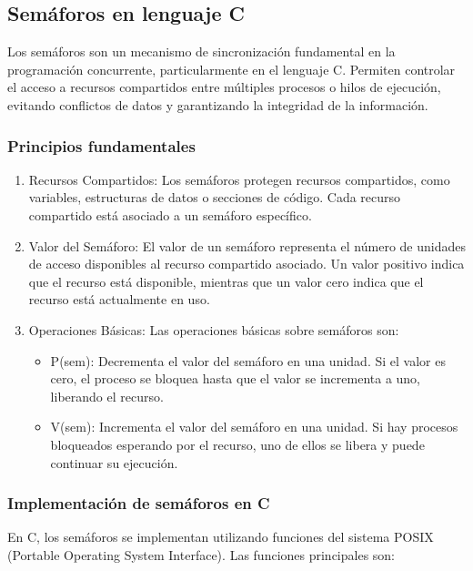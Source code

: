 \subsection{Semáforos en lenguaje C}

Los semáforos son un mecanismo de sincronización fundamental en la programación concurrente, particularmente en el lenguaje C. Permiten controlar el acceso a recursos compartidos entre múltiples procesos o hilos de ejecución, evitando conflictos de datos y garantizando la integridad de la información.

\subsubsection{Principios fundamentales}

\begin{enumerate}
	\def\labelenumi{\arabic{enumi}.}
	\item   Recursos Compartidos: Los semáforos protegen recursos compartidos,   como variables, estructuras de datos o secciones de código. Cada   recurso compartido está asociado a un semáforo específico.
	\item   Valor del Semáforo: El valor de un semáforo representa el número de   unidades de acceso disponibles al recurso compartido asociado. Un   valor positivo indica que el recurso está disponible, mientras que un   valor cero indica que el recurso está actualmente en uso.
	\item   Operaciones Básicas: Las operaciones básicas sobre semáforos son:
	\begin{itemize}
		\item P(sem): Decrementa el valor del semáforo en una unidad. Si el valor     es cero, el proceso se bloquea hasta que el valor se incrementa a     uno, liberando el recurso.
		\item V(sem): Incrementa el valor del semáforo en una unidad. Si hay     procesos bloqueados esperando por el recurso, uno de ellos se libera     y puede continuar su ejecución.
	\end{itemize}
\end{enumerate}\cite*{geeksforgeeks-semaforos-2022}

\subsubsection{Implementación de semáforos en C}

En C, los semáforos se implementan utilizando funciones del sistema POSIX (Portable Operating System Interface)\cite*{whiletruethendream-semaforos-posix-2018}. Las funciones principales son:

